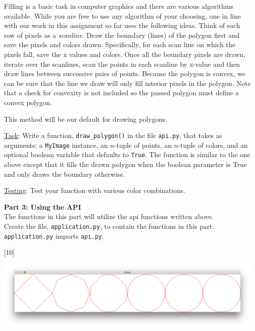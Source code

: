 \documentclass[addpoints]{exam}
\begin{document}
\begin{questions}
  Filling is a basic task in computer graphics and there are various algorithms available. While you are free to use any algorithm of your choosing, one in line with our work in this assignment so far uses the following ideas. Think of each row of pixels as a \textit{scanline}. Draw the boundary (lines) of the polygon first and save the pixels and colors drawn. Specifically, for each scan line on which the pixels fall, save the x values and colors. Once all the boundary pixels are drawn, iterate over the scanlines, scan the points in each scanline by x-value and then draw lines between successive pairs of points. 
  Because the polygon is convex, we can be sure that the line we draw will only fill interior pixels in the polygon. Note that a check for convexity is not included so the passed polygon must define a convex polygon.

  This method will be our default for drawing polygons.

  \underline{Task}: Write a function, \texttt{draw\_polygon()} in the file \texttt{api.py}, that takes as arguments: a \texttt{MyImage} instance, an $n$-tuple of points, an $n$-tuple of colors, and an optional boolean variable that defaults to \texttt{True}. The function is similar to the one above except that it fills the drawn polygon when the boolean parameter is True and only draws the boundary otherwise.

  \underline{Testing}: Test your function with various color combinations.

\begin{EnvFullwidth}
  {\Large\bf Part 3: Using the API}\\

  The functions in this part will utilize the api functions written above.\\ Create the file, \texttt{application.py}, to contain the functions in this part. \texttt{application.py} imports \texttt{api.py}.
\end{EnvFullwidth}
  
  [10]
  \begin{center}
    \includegraphics[width=\linewidth]{circle}
  \end{center}


\end{questions}
\end{document}
